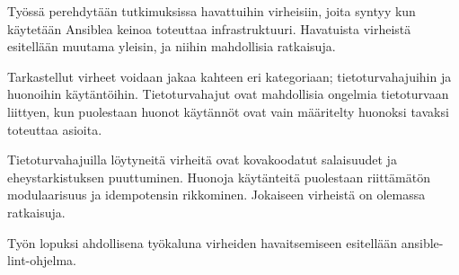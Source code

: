 Työssä perehdytään tutkimuksissa havattuihin virheisiin, joita syntyy kun
käytetään Ansiblea keinoa toteuttaa infrastruktuuri. Havatuista virheistä
esitellään muutama yleisin, ja niihin mahdollisia ratkaisuja.

Tarkastellut virheet voidaan jakaa kahteen eri kategoriaan;
tietoturvahajuihin ja huonoihin käytäntöihin. Tietoturvahajut ovat
mahdollisia ongelmia tietoturvaan liittyen, kun puolestaan huonot
käytännöt ovat vain määritelty huonoksi tavaksi toteuttaa asioita.

Tietoturvahajuilla löytyneitä virheitä ovat kovakoodatut salaisuudet
ja eheystarkistuksen puuttuminen. Huonoja käytänteitä puolestaan
riittämätön modulaarisuus ja idempotensin rikkominen. Jokaiseen
virheistä on olemassa ratkaisuja.

Työn lopuksi ahdollisena työkaluna virheiden havaitsemiseen esitellään
ansible-lint-ohjelma.
